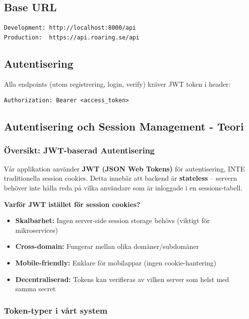 \documentclass[12pt,a4paper]{article}
\begin{document}
\subsection{Base URL}
\begin{verbatim}
Development: http://localhost:8000/api
Production:  https://api.roaring.se/api
\end{verbatim}

\subsection{Autentisering}
Alla endpoints (utom registrering, login, verify) kräver JWT token i header:
\begin{verbatim}
Authorization: Bearer <access_token>
\end{verbatim}

\subsection{Autentisering och Session Management - Teori}

\subsubsection{Översikt: JWT-baserad Autentisering}

Vår applikation använder \textbf{JWT (JSON Web Tokens)} för autentisering, INTE traditionella session cookies.
Detta innebär att backend är \textbf{stateless} -- servern behöver inte hålla reda på vilka 
användare som är inloggade i en sessions-tabell.

\textbf{Varför JWT istället för session cookies?}
\begin{itemize}[noitemsep]
  \item \textbf{Skalbarhet:} Ingen server-side session storage behövs (viktigt för mikroservices)
  \item \textbf{Cross-domain:} Fungerar mellan olika domäner/subdomäner
  \item \textbf{Mobile-friendly:} Enklare för mobilappar (ingen cookie-hantering)
  \item \textbf{Decentraliserad:} Tokens kan verifieras av vilken server som helst med samma secret
\end{itemize}

\subsubsection{Token-typer i vårt system}
\end{document}

